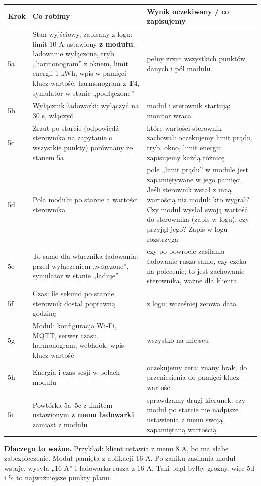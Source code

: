 \documentclass[11pt,a4paper]{article}
\begin{document}
\begin{longtable}{>{\raggedright\arraybackslash}p{3.00cm}>{\raggedright\arraybackslash}p{6.14cm}>{\raggedright\arraybackslash}p{6.14cm}}
\toprule
\rowcolor{apteallight}\textbf{Krok} & \textbf{Co robimy} & \textbf{Wynik oczekiwany / co zapisujemy} \\
\midrule\endhead
\bottomrule\endfoot
5a & Stan wyjściowy, zapisany z logu: limit 10 A ustawiony \textbf{z modułu}, ładowanie wyłączone, tryb „harmonogram” z oknem, limit energii 1 kWh, wpis w pamięci klucz-wartość, harmonogram z T4, symulator w stanie „podłączone” & pełny zrzut wszystkich punktów danych i pól modułu \\
5b & Wyłącznik ładowarki: wyłączyć na 30 s, włączyć & moduł i sterownik startują; monitor wraca \\
5c & Zrzut po starcie (odpowiedź sterownika na zapytanie o wszystkie punkty) porównany ze stanem 5a & które wartości sterownik zachował: oczekujemy limit prądu, tryb, okno, limit energii; zapisujemy każdą różnicę \\
5d & Pola modułu po starcie a wartości sterownika & pole „limit prądu” w module jest zapamiętywane w jego pamięci. Jeśli sterownik wstał z inną wartością niż moduł: kto wygrał? Czy moduł wysłał swoją wartość do sterownika (zapis w logu), czy przyjął jego? Zapis w logu rozstrzyga \\
5e & To samo dla włącznika ładowania: przed wyłączeniem „włączone”, symulator w stanie „ładuje” & czy po powrocie zasilania ładowanie rusza samo, czy czeka na polecenie; to jest zachowanie sterownika, ważne dla klienta \\
5f & Czas: ile sekund po starcie sterownik dostał poprawną godzinę & z logu; wcześniej zerowa data \\
5g & Moduł: konfiguracja Wi-Fi, MQTT, serwer czasu, harmonogram, webhook, wpis klucz-wartość & wszystko na miejscu \\
5h & Energia i czas sesji w polach modułu & oczekujemy zera: znany brak, do przeniesienia do pamięci klucz-wartość \\
5i & Powtórka 5a–5c z limitem ustawionym \textbf{z menu ładowarki} zamiast z modułu & sprawdzamy drugi kierunek: czy moduł po starcie nie nadpisze ustawienia z menu swoją zapamiętaną wartością \\
\end{longtable}

\textbf{Dlaczego to ważne.} Przykład: klient ustawia z menu 8 A, bo ma słabe zabezpieczenie. Moduł pamięta z aplikacji 16 A. Po zaniku zasilania moduł wstaje, wysyła „16 A” i ładowarka rusza z 16 A. Taki błąd byłby groźny, więc 5d i 5i to najważniejsze punkty planu.
\end{document}
